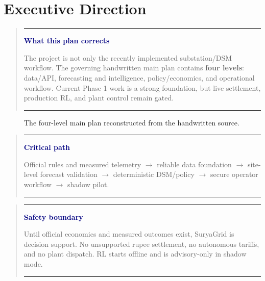 \documentclass[11pt,a4paper]{article}
\newenvironment{callout}[2][paleBlue]
  {\begin{quote}\color{ink}\noindent
   \textcolor{blue}{\rule{2.5pt}{12pt}}\hspace{6pt}
   \textbf{\textcolor{navy}{#2}}\par\smallskip}
  {\par\smallskip\textcolor{grid}{\rule{\linewidth}{0.4pt}}\end{quote}}
\begin{document}
\section{Executive Direction}

\begin{callout}{What this plan corrects}
The project is not only the recently implemented substation/DSM workflow. The governing
handwritten main plan contains \textbf{four levels}: data/API, forecasting and intelligence,
policy/economics, and operational workflow. Current Phase 1 work is a strong foundation, but
live settlement, production RL, and plant control remain gated.
\end{callout}

\begin{figure}[H]
\centering
{}
\caption{The four-level main plan reconstructed from the handwritten source.}
\end{figure}

\begin{callout}[paleGreen]{Critical path}
Official rules and measured telemetry $\rightarrow$ reliable data foundation $\rightarrow$
site-level forecast validation $\rightarrow$ deterministic DSM/policy $\rightarrow$
secure operator workflow $\rightarrow$ shadow pilot.
\end{callout}

\begin{callout}[paleAmber]{Safety boundary}
Until official economics and measured outcomes exist, SuryaGrid is decision support.
No unsupported rupee settlement, no autonomous tariffs, and no plant dispatch. RL starts
offline and is advisory-only in shadow mode.
\end{callout}
\end{document}
